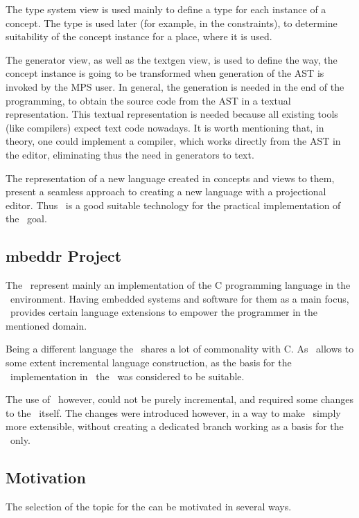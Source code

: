 The type system view is used mainly to define a type for each instance of a concept. The type is used later (for example, in the constraints), to 
determine suitability of the concept instance for a place, where it is used.

The generator view, as well as the textgen view, is used to define the way, the concept instance is going to be transformed when generation of the AST
is invoked by the MPS user. In general, the generation is needed in the end of the programming, to obtain the source code from the AST in a textual representation.
This textual representation is needed because all existing tools (like compilers) expect text code nowadays. It is worth mentioning that, in theory, one
could implement a compiler, which works directly from the AST in the editor, eliminating thus the need in generators to text.

The representation of a new language created in concepts and views to them, present a seamless approach to creating a new language with a projectional editor.
Thus \jbmps\ is a good suitable technology for the practical implementation of the \MT\ goal.

\subsection{mbeddr Project}

The \mbdrp\ represent mainly an implementation of the C programming language in the \jbmps\ environment. Having embedded systems
and software for them as a main focus, \mbdr\ provides certain language extensions to empower the programmer in the mentioned domain. 

Being a different language the \cpppl\ shares a lot of commonality with C. As \jbmps\ allows to some extent incremental language construction,
as the basis for the \cpppl\ implementation in \jbmps\ the \mbdrp\ was considered to be suitable. 

The use of \mbdr\, however, could not be purely incremental, and required some changes to the \mbdr\ itself. 
The changes were introduced however, in a way to make \mbdr\ simply more extensible, 
without creating a dedicated branch working as a basis for the \cpppl\ only.

\subsection{Motivation}

The selection of the topic for the \MT can be motivated in several ways.

